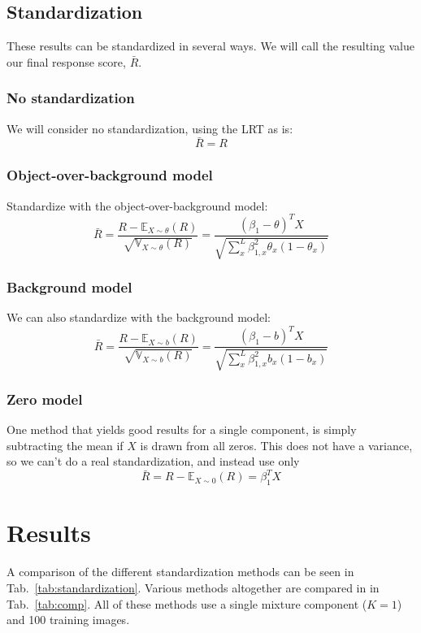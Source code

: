 \documentclass{article}
\begin{document}
\subsection{Standardization}

These results can be standardized in several ways. We will call the resulting value our final response score, $\bar R$.

\subsubsection{No standardization}
We will consider no standardization, using the LRT as is:
\[
    \bar R = R 
\]

\subsubsection{Object-over-background model}
Standardize with the object-over-background model:
\[
    \bar R = \frac{R - \mathbb{E}_{X \sim \theta}(R)}{\sqrt{\mathbb{V}_{X \sim \theta}(R)}} = \frac{(\beta_1 - \theta)^T X}{\sqrt{\sum_x^L \beta_{1,x}^2 \theta_x (1 - \theta_x)}}
\]
\subsubsection{Background model}
We can also standardize with the background model:
\[
    \bar R = \frac{R - \mathbb{E}_{X \sim b}(R)}{\sqrt{\mathbb{V}_{X \sim b}(R)}} = \frac{(\beta_1 - b)^T X}{\sqrt{\sum_x^L \beta_{1,x}^2 b_x (1 - b_x)}}
\]
\subsubsection{Zero model}
One method that yields good results for a single component, is simply subtracting the mean if $X$ is drawn from all zeros. This does not have a variance, so we can't do a real standardization, and instead use only 
\[
    \bar R = R - \mathbb{E}_{X \sim 0}(R) = \beta_1^T X
\]


\section{Results}
A comparison of the different standardization methods can be seen in Tab.~\ref{tab:standardization}. Various methods altogether are compared in in Tab.~\ref{tab:comp}. All of these methods use a single mixture component ($K = 1$) and 100 training images. 
\end{document}
